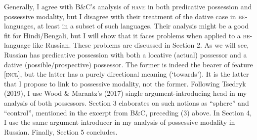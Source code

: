 \documentclass[12pt]{article}
\newenvironment{styleStandard}{\setlength\leftskip{0cm}\setlength\rightskip{0cm plus 1fil}\setlength\parindent{0cm}\setlength\parfillskip{0pt plus 1fil}\setlength\parskip{0in plus 1pt}\writerlistparindent\writerlistleftskip\leavevmode\normalfont\normalsize\writerlistlabel\ignorespaces}{\unskip\vspace{0.111in plus 0.0111in}\par}
\newcommand\writerlistleftskip{}
\newcommand\writerlistparindent{}
\newcommand\writerlistlabel{}
\begin{document}
\begin{styleStandard}
Generally, I agree with B\&C’s analysis of \textsc{have} in both predicative possession and possessive modality, but I disagree with their treatment of the dative case in \textsc{be}{}-languages, at least in a subset of such languages. Their analysis might be a good fit for Hindi/Bengali, but I will show that it faces problems when applied to a \textsc{be}{}-language like Russian. These problems are discussed in Section 2. As we will see, Russian has predicative possession with both a locative (actual) possessor and a dative (possible/prospective) possessor. The former is indeed the bearer of feature [\textsc{incl}], but the latter has a purely directional meaning (‘towards’). It is the latter that I propose to link to possessive modality, not the former. Following Tsedryk (2019), I use Wood \& Marantz’s (2017) single argument-introducing head in my analysis of both possessors. Section 3 elaborates on such notions as “sphere” and “control”, mentioned in the excerpt from B\&C, preceding (3) above. In Section 4, I use the same argument introducer in my analysis of possessive modality in Russian. Finally, Section 5 concludes. 
\end{styleStandard}
\end{document}
